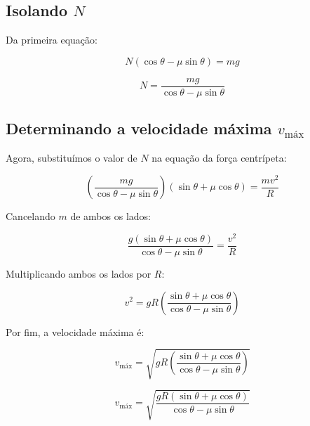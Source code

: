 \begin{flushleft}
\subsection*{Isolando \( N \)}

Da primeira equação:

\begin{equation}
N \left( \cos\theta - \mu \sin\theta \right) = mg
\end{equation}

\begin{equation}
N = \frac{mg}{\cos\theta - \mu \sin\theta}
\label{eq:N}
\end{equation}

\subsection*{Determinando a velocidade máxima \( v_{\text{máx}} \)}

Agora, substituímos o valor de \( N \) na equação da força centrípeta:

\begin{equation}
\left( \frac{mg}{\cos\theta - \mu \sin\theta} \right) \left( \sin\theta + \mu \cos\theta \right) = \frac{mv^2}{R}
\end{equation}

Cancelando \( m \) de ambos os lados:

\begin{equation}
\frac{g \left( \sin\theta + \mu \cos\theta \right)}{\cos\theta - \mu \sin\theta} = \frac{v^2}{R}
\end{equation}

Multiplicando ambos os lados por \( R \):

\begin{equation}
v^2 = gR \left( \frac{ \sin\theta + \mu \cos\theta }{ \cos\theta - \mu \sin\theta } \right)
\end{equation}

Por fim, a velocidade máxima é:

\begin{equation}
v_{\text{máx}} = \sqrt{ gR \left( \frac{ \sin\theta + \mu \cos\theta }{ \cos\theta - \mu \sin\theta } \right) }
\end{equation}

\begin{equation}
\boxed{
v_{\text{máx}} = \sqrt{ \frac{gR\left( \sin\theta + \mu \cos\theta \right)}{ \cos\theta - \mu \sin\theta } }
}
\end{equation}


\end{flushleft}
